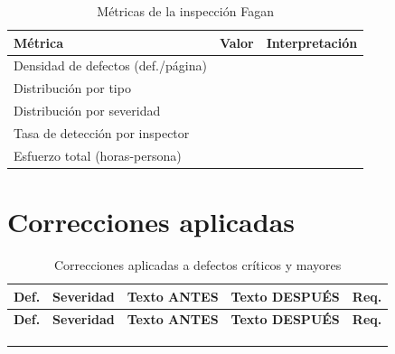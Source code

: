 \documentclass[journal,onecolumn]{IEEEtran}
\newcommand{\guia}[2]{%
	\begin{mdframed}[style=guia]
		\sloppy
		\noindent\textbf{Responsable: #1}\\[2pt]
		#2
	\end{mdframed}
}
\newif\ifguias
\let\guiaoriginal\guia
\renewcommand{\guia}[2]{\ifguias\guiaoriginal{#1}{#2}\fi}
\begin{document}
	\begin{table}[H]
		\centering
		\caption{Métricas de la inspección Fagan}
		\begin{tabular}{L{4.8cm} C{2.4cm} L{5.6cm}}
			\toprule
			\textbf{Métrica} & \textbf{Valor} & \textbf{Interpretación} \\
			\midrule
			Densidad de defectos (def./página) & & \\
			Distribución por tipo              & & \\
			Distribución por severidad         & & \\
			Tasa de detección por inspector    & & \\
			Esfuerzo total (horas-persona)     & & \\
			\bottomrule
		\end{tabular}
	\end{table}
	
	\guia{Jonathan (Integrante 3)}{%
		Calcular las \textbf{cinco} métricas en \texttt{metricas.xlsx} y graficar al menos dos
		(distribución por tipo y por severidad). Guardar las figuras en
		\texttt{05\_Informe/figuras/} e insertarlas aquí con \texttt{\textbackslash includegraphics},
		numeradas y referenciadas desde el texto.\\[3pt]
		La columna «Interpretación» es la que otorga el nivel Excelente: cada métrica necesita
		\textbf{una oración que diga qué revela sobre el ERS de MundiPets}, no qué significa la
		fórmula. Si los defectos de verificabilidad se concentran en los RNF y no en los RF, eso
		dice algo concreto sobre cómo se redactaron los umbrales, y esa es la oración que hay que
		escribir. Métricas sin interpretar bajan el criterio C2 a nivel 2.\\[3pt]
		Dato útil para la densidad: el ERS declara 50 elementos especificados (25~RF + 16~RNF +
		9~RD). Sirve como denominador alternativo si se decide reportar defectos por requisito
		además de por página; en ese caso, declarar explícitamente cuál se usa.}
	
	\section{Correcciones aplicadas}
	
	\begin{longtable}{C{1.2cm} L{1.8cm} L{4.6cm} L{4.6cm} L{1.6cm}}
		\caption{Correcciones aplicadas a defectos críticos y mayores}\label{tab:correcciones}\\
		\toprule
		\textbf{Def.} & \textbf{Severidad} & \textbf{Texto ANTES} & \textbf{Texto DESPUÉS} &
		\textbf{Req.} \\
		\midrule
		\endfirsthead
		\toprule
		\textbf{Def.} & \textbf{Severidad} & \textbf{Texto ANTES} & \textbf{Texto DESPUÉS} &
		\textbf{Req.} \\
		\midrule
		\endhead
		\bottomrule
		\endfoot
		& & & & \\
		& & & & \\
		& & & & \\
	\end{longtable}
	
\end{document}
